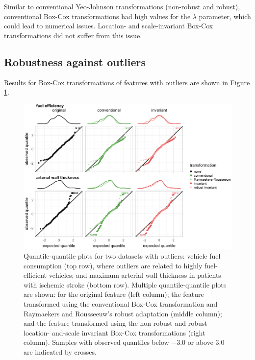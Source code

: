 \documentclass[preprint,12pt,authoryear]{elsarticle}
\begin{document}
Similar to conventional Yeo-Johnson transformations (non-robust and
robust), conventional Box-Cox transformations had high values for the
\(\lambda\) parameter, which could lead to numerical issues. Location-
and scale-invariant Box-Cox transformations did not suffer from this
issue.

\subsection{Robustness against
outliers}\label{sec-app:robustness-against-outliers}

Results for Box-Cox transformations of features with outliers are shown
in Figure \ref{fig:experimental-results-outlier-robustness-appendix}.

\begin{figure}

{\centering \includegraphics[width=1\linewidth]{figure_appendix_3} 

}

\caption{Quantile-quantile plots for two datasets with outliers: vehicle fuel consumption (top row), where outliers are related to highly fuel-efficient vehicles; and maximum arterial wall thickness in patients with ischemic stroke (bottom row). Multiple quantile-quantile plots are shown: for the original feature (left column); the feature transformed using the conventional Box-Cox transformation and Raymaekers and Rousseeuw's robust adaptation (middle column); and the feature transformed using the non-robust and robust location- and-scale invariant Box-Cox transformations (right column). Samples with observed quantiles below $-3.0$ or above $3.0$ are indicated by crosses.}\label{fig:experimental-results-outlier-robustness-appendix}
\end{figure}
\end{document}
